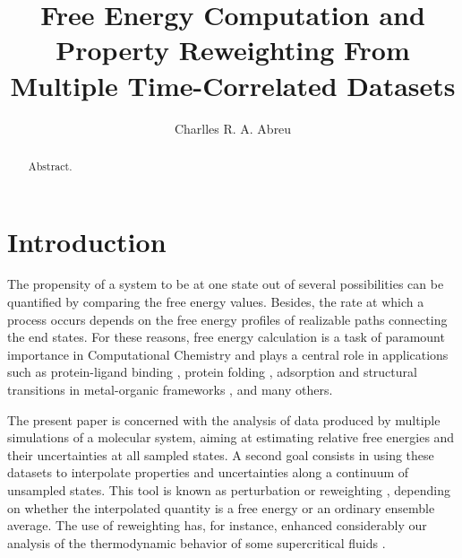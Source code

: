 \documentclass[
    journal=jctcce,
    layout=twocolumn
]{achemso}
\author{Charlles R. A. Abreu}
\affiliation{Chemical Engineering Department, Escola de Quimica, Universidade Federal do Rio de Janeiro, Rio de Janeiro, RJ 21941-909, Brazil}
\title{Free Energy Computation and Property Reweighting From Multiple Time-Correlated Datasets}
\begin{document}


\begin{abstract}
Abstract.
\end{abstract}

\section{Introduction}
\label{sec:introduction}

The propensity of a system to be at one state out of several possibilities can be quantified by comparing the free energy values. Besides, the rate at which a process occurs depends on the free energy profiles of realizable paths connecting the end states. For these reasons, free energy calculation is a task of paramount importance in Computational Chemistry \cite{Chipot_2007, Christ_2010, Hansen_2014} and plays a central role in applications such as protein-ligand binding \cite{Chodera_2011, Abel_2017, *Abel_2017_2, Cournia_2017, Mobley_2017}, protein folding \cite{Perez_2016}, adsorption and structural transitions in metal-organic frameworks \cite{Coudert_2008, Bousquet_2012, Ghysels_2013, Demuynck_2017}, and many others.

The present paper is concerned with the analysis of data produced by multiple simulations of a molecular system, aiming at estimating relative free energies and their uncertainties at all sampled states. A second goal consists in using these datasets to interpolate properties and uncertainties along a continuum of unsampled states. This tool is known as perturbation \cite{Zwanzig_1954} or reweighting \cite{McDonald_1967, *McDonald_1969}, depending on whether the interpolated quantity is a free energy or an ordinary ensemble average. The use of reweighting has, for instance, enhanced considerably our analysis of the thermodynamic behavior of some supercritical fluids \cite{Aimoli_2014, *Aimoli_2014_2, Nichele_2018}.
\end{document}

